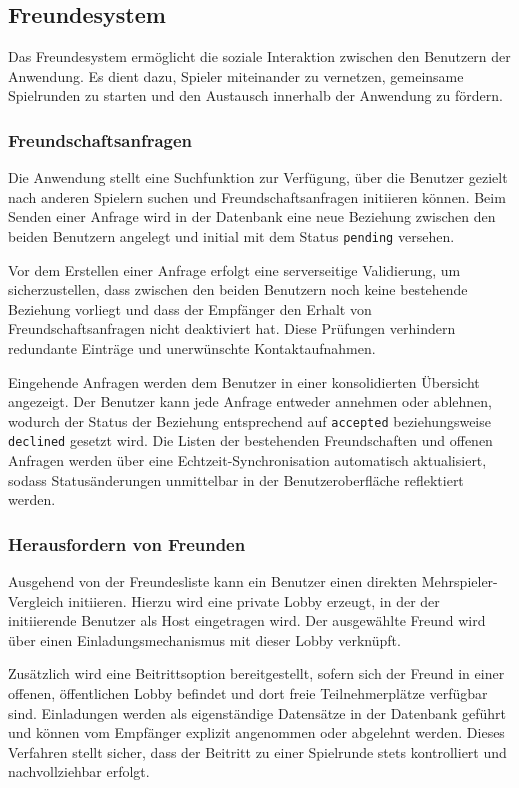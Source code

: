 \subsection{Freundesystem}
Das Freundesystem ermöglicht die soziale Interaktion zwischen den Benutzern der Anwendung.
Es dient dazu, Spieler miteinander zu vernetzen, gemeinsame Spielrunden zu starten
und den Austausch innerhalb der Anwendung zu fördern.
\subsubsection{Freundschaftsanfragen}
Die Anwendung stellt eine Suchfunktion zur Verfügung, über die Benutzer gezielt nach anderen Spielern suchen und Freundschaftsanfragen initiieren können. 
Beim Senden einer Anfrage wird in der Datenbank eine neue Beziehung zwischen den beiden Benutzern angelegt und initial mit dem Status \texttt{pending} versehen.

Vor dem Erstellen einer Anfrage erfolgt eine serverseitige Validierung, um sicherzustellen, dass zwischen den beiden Benutzern noch keine bestehende Beziehung vorliegt und dass der Empfänger den Erhalt von Freundschaftsanfragen nicht deaktiviert hat. 
Diese Prüfungen verhindern redundante Einträge und unerwünschte Kontaktaufnahmen.

Eingehende Anfragen werden dem Benutzer in einer konsolidierten Übersicht angezeigt. 
Der Benutzer kann jede Anfrage entweder annehmen oder ablehnen, wodurch der Status der Beziehung entsprechend auf \texttt{accepted} beziehungsweise \texttt{declined} gesetzt wird. 
Die Listen der bestehenden Freundschaften und offenen Anfragen werden über eine Echtzeit-Synchronisation automatisch aktualisiert, sodass Statusänderungen unmittelbar in der Benutzeroberfläche reflektiert werden.

\subsubsection{Herausfordern von Freunden}
Ausgehend von der Freundesliste kann ein Benutzer einen direkten Mehrspieler-Vergleich initiieren. 
Hierzu wird eine private Lobby erzeugt, in der der initiierende Benutzer als Host eingetragen wird. 
Der ausgewählte Freund wird über einen Einladungsmechanismus mit dieser Lobby verknüpft.

Zusätzlich wird eine Beitrittsoption bereitgestellt, sofern sich der Freund in einer offenen, öffentlichen Lobby befindet und dort freie Teilnehmerplätze verfügbar sind. 
Einladungen werden als eigenständige Datensätze in der Datenbank geführt und können vom Empfänger explizit angenommen oder abgelehnt werden. 
Dieses Verfahren stellt sicher, dass der Beitritt zu einer Spielrunde stets kontrolliert und nachvollziehbar erfolgt.

